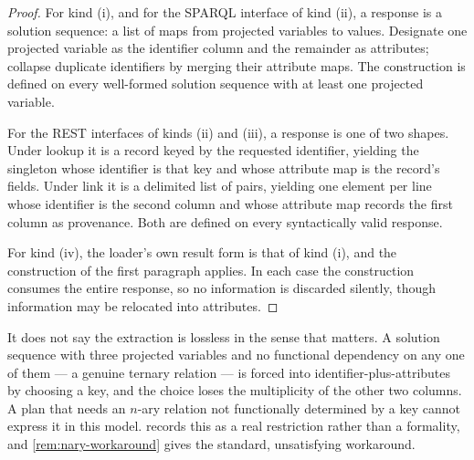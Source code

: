 \begin{proof}
For kind (i), and for the SPARQL interface of kind (ii), a response is a
solution sequence: a list of maps from projected variables to values. Designate
one projected variable as the identifier column and the remainder as
attributes; collapse duplicate identifiers by merging their attribute maps.
The construction is defined on every well-formed solution sequence with at
least one projected variable.

For the REST interfaces of kinds (ii) and (iii), a response is one of two
shapes. Under \textsf{lookup} it is a record keyed by the requested identifier,
yielding the singleton whose identifier is that key and whose attribute map is
the record's fields. Under \textsf{link} it is a delimited list of pairs,
yielding one element per line whose identifier is the second column and whose
attribute map records the first column as provenance. Both are defined on every
syntactically valid response.

For kind (iv), the loader's own result form is that of kind (i), and the
construction of the first paragraph applies. In each case the construction
consumes the entire response, so no information is discarded silently, though
information may be relocated into attributes.
\end{proof}

\begin{remark}
\label{rem:extraction-lossy}
It does not say the extraction is lossless in the sense that matters. A
solution sequence with three projected variables and no functional dependency
on any one of them --- a genuine ternary relation --- is forced into
identifier-plus-attributes by choosing a key, and the choice loses the
multiplicity of the other two columns. A plan that needs an $n$-ary relation
not functionally determined by a key cannot express it in this model.
 records this as a real restriction rather than a formality,
and \cref{rem:nary-workaround} gives the standard, unsatisfying workaround.
\end{remark}

